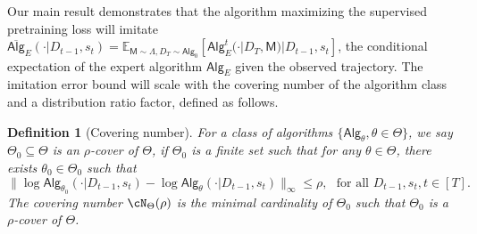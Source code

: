 \documentclass[10pt]{article}
\newtheorem{lemma}[theorem]{Lemma}
\newtheorem{definition}[theorem]{Definition}
\renewcommand{\epsilon}{\varepsilon}
\newcommand{\<}{\left\langle}
\renewcommand{\>}{\right\rangle}
\newcommand{\paren}[1]{{\left( #1 \right)}}
\newcommand{\brac}[1]{{\left[ #1 \right]}}
\newcommand{\E}{\mathbb{E}}
\renewcommand{\P}{\mathbb{P}}
\newcommand{\inst}{{\mathsf{M}}}
\newcommand{\HelDs}{{\mathrm{D}^2_{\mathrm{H}}}}
\newcommand{\state}{{s}}
\newcommand{\totlen}{{T}} %
\newcommand{\sAlg}{{\mathsf{Alg}}}
\newcommand{\osAlg}{\overline{\mathsf{Alg}}}
\newcommand{\dset}{{D}}
\newcommand{\Numobs}{{n}}   %
\newcommand{\Par}{{\theta}}
\newcommand{\Parspace}{{\Theta}}
\newcommand{\EstPar}{{\widehat{\theta}}}
\newcommand{\prior}{{\Lambda}}
\newcommand{\shortexp}{{E}}
\newcommand{\geneps}{{\epsilon}_{\sf real}}
\newcommand{\authnote}[2]{{\scriptsize $\ll$\textsf{#1 notes: #2}$\gg$}}
\newcommand{\authnote}[2]{}
\newcommand{\yub}[1]{{\color{red}\authnote{Yu}{#1}}}
\begin{document}


Our main result demonstrates that the algorithm maximizing the supervised pretraining loss will imitate $\osAlg_{\shortexp}(\cdot|\dset_{t-1},\state_t) = \E_{\inst\sim \prior,  \dset_{\totlen} \sim \sAlg_0}[\sAlg_{\shortexp}^t(\cdot|\dset_\totlen,\inst)|\dset_{t-1},\state_t]$, the conditional expectation of the expert algorithm $\sAlg_{\shortexp}$ given the observed trajectory. The imitation error bound will scale with the covering number of the algorithm class and a  distribution ratio factor, defined as follows.

\begin{definition}[Covering number]\label{def:cover_number_general} For a class of algorithms $\{\sAlg_\Par,\Par\in\Parspace\}$, 
we say $\Parspace_0 \subseteq\Parspace$ is an  $\rho$-cover of $\Parspace$, if $\Parspace_0$ is a finite set such that for any $\Par\in\Parspace$, there exists $\Par_0\in\Parspace_0$ such that 
\[
\|\log \sAlg_{\Par_0}(\cdot|\dset_{t-1},\state_t)-\log \sAlg_{\Par}(\cdot|\dset_{t-1},\state_t)\|_{\infty}\leq\rho,~~~ \text{for all } \dset_{t-1},\state_t, t\in[\totlen].
\]
The covering number $\cN_{\Parspace}(\rho)$ is the minimal cardinality of $\Parspace_0$ such that $\Parspace_0$ is a $\rho$-cover of $\Parspace$.
\end{definition}




\end{document}
